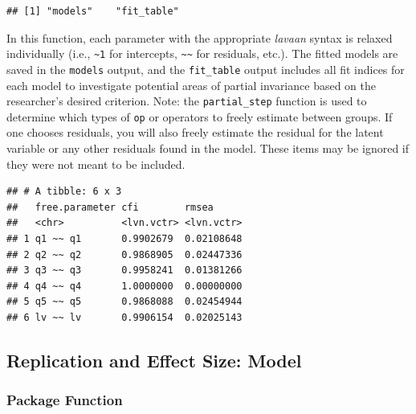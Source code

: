 \documentclass[
  man]{apa7}
\newenvironment{Shaded}{\begin{snugshade}}{\end{snugshade}}
\newcommand{\FunctionTok}[1]{\textcolor[rgb]{0.13,0.29,0.53}{\textbf{#1}}}
\newcommand{\NormalTok}[1]{#1}
\newcommand{\SpecialCharTok}[1]{\textcolor[rgb]{0.81,0.36,0.00}{\textbf{#1}}}
\begin{document}
\normalsize

\begin{verbatim}
## [1] "models"    "fit_table"
\end{verbatim}

In this function, each parameter with the appropriate \emph{lavaan} syntax is relaxed individually (i.e., \texttt{\textasciitilde{}1} for intercepts, \texttt{\textasciitilde{}\textasciitilde{}} for residuals, etc.). The fitted models are saved in the \texttt{models} output, and the \texttt{fit\_table} output includes all fit indices for each model to investigate potential areas of partial invariance based on the researcher's desired criterion. Note: the \texttt{partial\_step} function is used to determine which types of \texttt{op} or operators to freely estimate between groups. If one chooses residuals, you will also freely estimate the residual for the latent variable or any other residuals found in the model. These items may be ignored if they were not meant to be included.

\small

\begin{Shaded}
\end{Shaded}

\normalsize

\begin{verbatim}
## # A tibble: 6 x 3
##   free.parameter cfi        rmsea     
##   <chr>          <lvn.vctr> <lvn.vctr>
## 1 q1 ~~ q1       0.9902679  0.02108648
## 2 q2 ~~ q2       0.9868905  0.02447336
## 3 q3 ~~ q3       0.9958241  0.01381266
## 4 q4 ~~ q4       1.0000000  0.00000000
## 5 q5 ~~ q5       0.9868088  0.02454944
## 6 lv ~~ lv       0.9906154  0.02025143
\end{verbatim}

\hypertarget{replication-and-effect-size-model}{%
\subsection{Replication and Effect Size: Model}\label{replication-and-effect-size-model}}

\hypertarget{package-function-2}{%
\subsubsection{Package Function}\label{package-function-2}}
\end{document}
